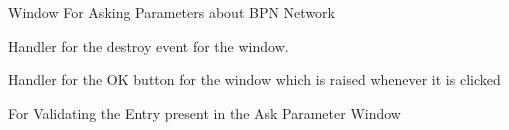 \documentclass[letterpaper,10pt,english]{sphinxmanual}
\begin{document}
\label{index:module-ask_param}

\begin{fulllineitems}
\label{index:ask_param.askparam_window}
Window For Asking Parameters about BPN Network


\begin{fulllineitems}
\label{index:ask_param.askparam_window.on_config_standard_destroy}
Handler for the destroy event for the window.

\end{fulllineitems}



\begin{fulllineitems}
\label{index:ask_param.askparam_window.on_ok}
Handler for the OK button for the window which is raised
whenever it is clicked

\end{fulllineitems}



\begin{fulllineitems}
\label{index:ask_param.askparam_window.validate_parameters}
For Validating the Entry present in the Ask Parameter Window

\end{fulllineitems}


\end{fulllineitems}

\label{index:module-network_evol}
\end{document}
